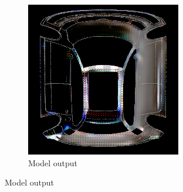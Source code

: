 \begin{figure}
\begin{subfigure}[t]{0.4\linewidth}
        \includegraphics[width=\linewidth]{graphics/results_1_albedo.png}
        \caption{Model output}
    \end{subfigure}
\end{figure}

